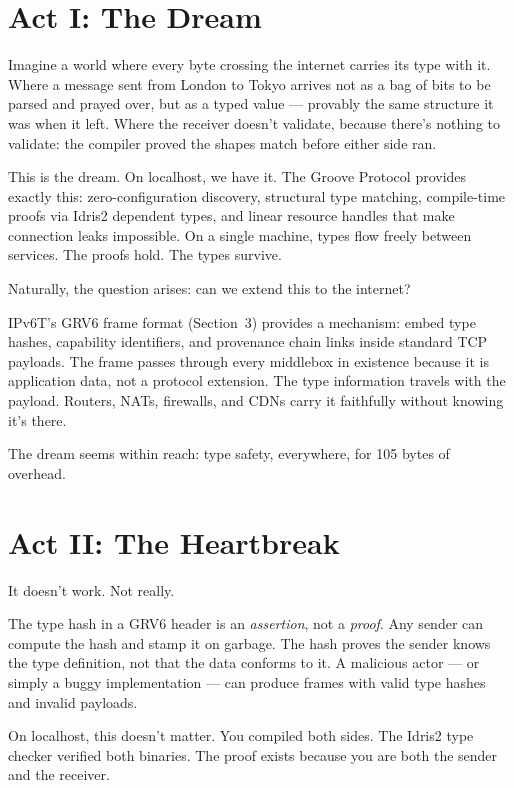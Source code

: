 \documentclass[11pt,a4paper]{article}
\begin{document}
\section{Act I: The Dream}

Imagine a world where every byte crossing the internet carries its type
with it. Where a message sent from London to Tokyo arrives not as a bag
of bits to be parsed and prayed over, but as a typed value --- provably
the same structure it was when it left. Where the receiver doesn't
validate, because there's nothing to validate: the compiler proved the
shapes match before either side ran.

This is the dream. On localhost, we have it. The Groove Protocol
\cite{groove2026} provides exactly this: zero-configuration discovery,
structural type matching, compile-time proofs via Idris2 dependent types,
and linear resource handles that make connection leaks impossible. On a
single machine, types flow freely between services. The proofs hold. The
types survive.

Naturally, the question arises: can we extend this to the internet?

IPv6T's GRV6 frame format (Section~3) provides a mechanism: embed type
hashes, capability identifiers, and provenance chain links inside
standard TCP payloads. The frame passes through every middlebox in
existence because it is application data, not a protocol extension. The
type information travels with the payload. Routers, NATs, firewalls, and
CDNs carry it faithfully without knowing it's there.

The dream seems within reach: type safety, everywhere, for 105 bytes of
overhead.

\section{Act II: The Heartbreak}

It doesn't work. Not really.

The type hash in a GRV6 header is an \emph{assertion}, not a
\emph{proof}. Any sender can compute the hash and stamp it on garbage.
The hash proves the sender knows the type definition, not that the data
conforms to it. A malicious actor --- or simply a buggy implementation
--- can produce frames with valid type hashes and invalid payloads.

On localhost, this doesn't matter. You compiled both sides. The Idris2
type checker verified both binaries. The proof exists because you are
both the sender and the receiver.
\end{document}
